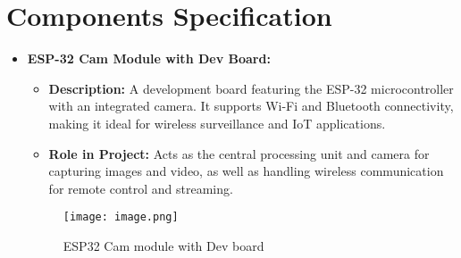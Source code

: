 \documentclass[12pt]{article}
\begin{document}
\newpage

\section{Components Specification}
\newline
\begin{itemize}
    \item \textbf{ESP-32 Cam Module with Dev Board:}
    \begin{itemize}
        \item \textbf{Description:} A development board featuring the ESP-32 microcontroller with an integrated camera. It supports Wi-Fi and Bluetooth connectivity, making it ideal for wireless surveillance and IoT applications.
        \item \textbf{Role in Project:} Acts as the central processing unit and camera for capturing images and video, as well as handling wireless communication for remote control and streaming.
    \end{itemize}
    \begin{figure}[h]
        \centering
        \texttt{[image: image.png]}
        \caption{ESP32 Cam module with Dev board}
        \label{fig:enter-label}
    \end{figure}


\end{itemize}
\end{document}
